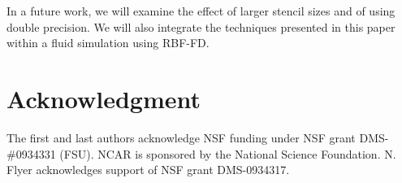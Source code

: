 \documentclass[10pt,conference,compsocconf]{IEEEtran}
\begin{document}
In a future work, we will examine the effect of larger stencil sizes
and of using double precision. We will also integrate the techniques
presented in this paper within a fluid simulation using RBF-FD.

\section*{Acknowledgment}
The first and last authors acknowledge NSF funding under NSF grant
DMS-\#0934331 (FSU). NCAR is sponsored by the National Science
Foundation. N. Flyer acknowledges support of NSF grant DMS-0934317.



\end{document}

